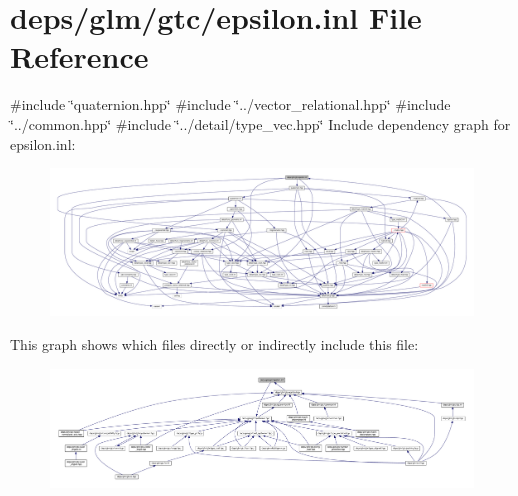 \hypertarget{epsilon_8inl}{}\section{deps/glm/gtc/epsilon.inl File Reference}
\label{epsilon_8inl}
{\ttfamily \#include \char`\"{}quaternion.\+hpp\char`\"{}}\newline
{\ttfamily \#include \char`\"{}../vector\+\_\+relational.\+hpp\char`\"{}}\newline
{\ttfamily \#include \char`\"{}../common.\+hpp\char`\"{}}\newline
{\ttfamily \#include \char`\"{}../detail/type\+\_\+vec.\+hpp\char`\"{}}\newline
Include dependency graph for epsilon.\+inl\+:
\nopagebreak
\begin{figure}[H]
\begin{center}
\leavevmode
\includegraphics[width=350pt]{da/dc0/epsilon_8inl__incl}
\end{center}
\end{figure}
This graph shows which files directly or indirectly include this file\+:
\nopagebreak
\begin{figure}[H]
\begin{center}
\leavevmode
\includegraphics[width=350pt]{d3/d16/epsilon_8inl__dep__incl}
\end{center}
\end{figure}
